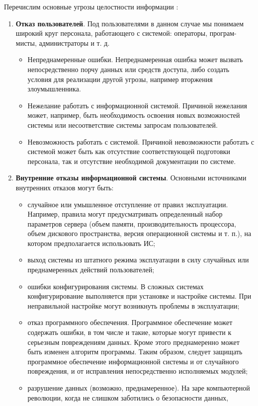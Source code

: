 Перечислим основные угрозы целостности информации \autocite{Pirogov2009}:
\begin{enumerate}
\item \textbf{Отказ пользователей}. Под пользователями в данном случае мы понимаем
широкий круг персонала, работающего с системой: операторы, програм-
мисты, администраторы и т. д.
\begin{itemize}
\item Непреднамеренные ошибки. Непреднамеренная ошибка может вызвать
непосредственно порчу данных или средств доступа, либо создать условия для реализации другой угрозы, например вторжения злоумышленника.
\item Нежелание работать с информационной системой. Причиной нежелания может, например, быть необходимость освоения новых возможностей системы или несоответствие системы запросам пользователей.
\item Невозможность работать с системой. Причиной невозможности работать с системой может быть как отсутствие соответствующей подготовки персонала, так и отсутствие необходимой документации по системе.
\end{itemize}
\item \textbf{Внутренние отказы информационной системы}. Основными источниками внутренних отказов могут быть:
\begin{itemize}
\item случайное или умышленное отступление от правил эксплуатации. Например, правила могут предусматривать определенный набор параметров сервера (объем памяти, производительность процессора, объем
дискового пространства, версия операционной системы и т. п.), на котором предполагается использовать ИС;
\item выход системы из штатного режима эксплуатации в силу случайных
или преднамеренных действий пользователей;
\item ошибки конфигурирования системы. В сложных системах конфигурирование выполняется при установке и настройке системы. При неправильной настройке могут возникнуть проблемы в эксплуатации;
\item отказ программного обеспечения. Программное обеспечение может содержать ошибки, в том числе и такие, которые могут привести к серьезным повреждениям данных. Кроме этого преднамеренно может быть
изменен алгоритм программы. Таким образом, следует защищать программное обеспечение информационной системы и от случайного повреждения, и от исправления непосредственно исполняемых модулей;
\item разрушение данных (возможно, преднамеренное). На заре компьютерной революции, когда не слишком заботились о безопасности данных,

\end{itemize}
\end{enumerate}
